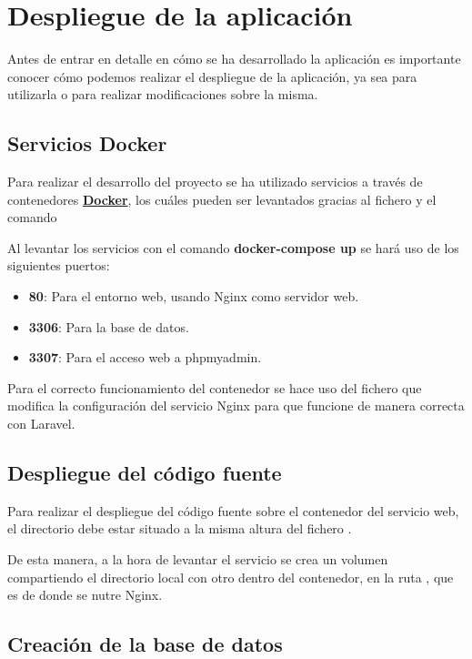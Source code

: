 \documentclass{\ClassPath/viu-tfm-template}
\begin{document}
\chapter{Despliegue de la aplicación}
Antes de entrar en detalle en cómo se ha desarrollado la aplicación es importante conocer cómo podemos realizar el despliegue de la aplicación, ya sea para utilizarla o para realizar modificaciones sobre la misma.

\section{Servicios Docker}
Para realizar el desarrollo del proyecto se ha utilizado servicios a través de contenedores \textbf{\href{https://www.docker.com/}{Docker}}, los cuáles pueden ser levantados gracias al fichero  y el comando 

Al levantar los servicios con el comando \textbf{docker-compose up} se hará uso de los siguientes puertos:
\vspace{-1em}
\begin{itemize}
    \item \textbf{80}: Para el entorno web, usando Nginx como servidor web.
    \item \textbf{3306}: Para la base de datos.
    \item \textbf{3307}: Para el acceso web a phpmyadmin.
\end{itemize}
\vspace{-1em}

Para el correcto funcionamiento del contenedor se hace uso del fichero  que modifica la configuración del servicio Nginx para que funcione de manera correcta con Laravel.

\section{Despliegue del código fuente}
Para realizar el despliegue del código fuente sobre el contenedor del servicio web, el directorio  debe estar situado a la misma altura del fichero .

De esta manera, a la hora de levantar el servicio se crea un volumen compartiendo el directorio local  con otro dentro del contenedor, en la ruta , que es de donde se nutre Nginx.


\section{Creación de la base de datos}
\end{document}
